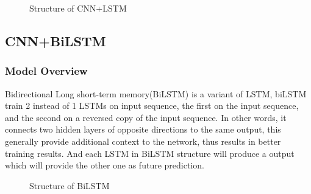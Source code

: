 \documentclass{article}
\begin{document}
\begin{figure}[h]
	\centering
	\caption{Structure of CNN+LSTM}
	\label{LSTMstruct}
\end{figure} 

\subsection{CNN+BiLSTM}
\subsubsection{Model Overview}
Bidirectional Long short-term memory(BiLSTM) is a variant of LSTM, biLSTM train 2 instead of 1 LSTMs on input sequence, the first on the input sequence, and the second on a reversed copy of the input sequence. In other words, it connects two hidden layers of opposite directions to the same output, this generally provide additional context to the network, thus results in better training results. And each LSTM in BiLSTM structure will produce a output which will provide the other one as future prediction. 

\begin{figure}[h]
	\centering
	\caption{Structure of BiLSTM}
\end{figure} 
\end{document}

